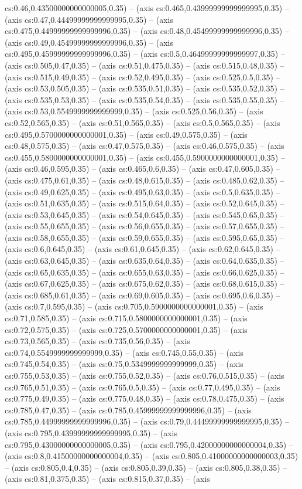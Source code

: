 cs:0.46,0.43500000000000005,0.35) -- (axis cs:0.465,0.43999999999999995,0.35) -- (axis cs:0.47,0.44499999999999995,0.35) -- (axis cs:0.475,0.44999999999999996,0.35) -- (axis cs:0.48,0.45499999999999996,0.35) -- (axis cs:0.49,0.45499999999999996,0.35) -- (axis cs:0.495,0.45999999999999996,0.35) -- (axis cs:0.5,0.46499999999999997,0.35) -- (axis cs:0.505,0.47,0.35) -- (axis cs:0.51,0.475,0.35) -- (axis cs:0.515,0.48,0.35) -- (axis cs:0.515,0.49,0.35) -- (axis cs:0.52,0.495,0.35) -- (axis cs:0.525,0.5,0.35) -- (axis cs:0.53,0.505,0.35) -- (axis cs:0.535,0.51,0.35) -- (axis cs:0.535,0.52,0.35) -- (axis cs:0.535,0.53,0.35) -- (axis cs:0.535,0.54,0.35) -- (axis cs:0.535,0.55,0.35) -- (axis cs:0.53,0.5549999999999999,0.35) -- (axis cs:0.525,0.56,0.35) -- (axis cs:0.52,0.565,0.35) -- (axis cs:0.51,0.565,0.35) -- (axis cs:0.5,0.565,0.35) -- (axis cs:0.495,0.5700000000000001,0.35) -- (axis cs:0.49,0.575,0.35) -- (axis cs:0.48,0.575,0.35) -- (axis cs:0.47,0.575,0.35) -- (axis cs:0.46,0.575,0.35) -- (axis cs:0.455,0.5800000000000001,0.35) -- (axis cs:0.455,0.5900000000000001,0.35) -- (axis cs:0.46,0.595,0.35) -- (axis cs:0.465,0.6,0.35) -- (axis cs:0.47,0.605,0.35) -- (axis cs:0.475,0.61,0.35) -- (axis cs:0.48,0.615,0.35) -- (axis cs:0.485,0.62,0.35) -- (axis cs:0.49,0.625,0.35) -- (axis cs:0.495,0.63,0.35) -- (axis cs:0.5,0.635,0.35) -- (axis cs:0.51,0.635,0.35) -- (axis cs:0.515,0.64,0.35) -- (axis cs:0.52,0.645,0.35) -- (axis cs:0.53,0.645,0.35) -- (axis cs:0.54,0.645,0.35) -- (axis cs:0.545,0.65,0.35) -- (axis cs:0.55,0.655,0.35) -- (axis cs:0.56,0.655,0.35) -- (axis cs:0.57,0.655,0.35) -- (axis cs:0.58,0.655,0.35) -- (axis cs:0.59,0.655,0.35) -- (axis cs:0.595,0.65,0.35) -- (axis cs:0.6,0.645,0.35) -- (axis cs:0.61,0.645,0.35) -- (axis cs:0.62,0.645,0.35) -- (axis cs:0.63,0.645,0.35) -- (axis cs:0.635,0.64,0.35) -- (axis cs:0.64,0.635,0.35) -- (axis cs:0.65,0.635,0.35) -- (axis cs:0.655,0.63,0.35) -- (axis cs:0.66,0.625,0.35) -- (axis cs:0.67,0.625,0.35) -- (axis cs:0.675,0.62,0.35) -- (axis cs:0.68,0.615,0.35) -- (axis cs:0.685,0.61,0.35) -- (axis cs:0.69,0.605,0.35) -- (axis cs:0.695,0.6,0.35) -- (axis cs:0.7,0.595,0.35) -- (axis cs:0.705,0.5900000000000001,0.35) -- (axis cs:0.71,0.585,0.35) -- (axis cs:0.715,0.5800000000000001,0.35) -- (axis cs:0.72,0.575,0.35) -- (axis cs:0.725,0.5700000000000001,0.35) -- (axis cs:0.73,0.565,0.35) -- (axis cs:0.735,0.56,0.35) -- (axis cs:0.74,0.5549999999999999,0.35) -- (axis cs:0.745,0.55,0.35) -- (axis cs:0.745,0.54,0.35) -- (axis cs:0.75,0.5349999999999999,0.35) -- (axis cs:0.755,0.53,0.35) -- (axis cs:0.755,0.52,0.35) -- (axis cs:0.76,0.515,0.35) -- (axis cs:0.765,0.51,0.35) -- (axis cs:0.765,0.5,0.35) -- (axis cs:0.77,0.495,0.35) -- (axis cs:0.775,0.49,0.35) -- (axis cs:0.775,0.48,0.35) -- (axis cs:0.78,0.475,0.35) -- (axis cs:0.785,0.47,0.35) -- (axis cs:0.785,0.45999999999999996,0.35) -- (axis cs:0.785,0.44999999999999996,0.35) -- (axis cs:0.79,0.44499999999999995,0.35) -- (axis cs:0.795,0.43999999999999995,0.35) -- (axis cs:0.795,0.43000000000000005,0.35) -- (axis cs:0.795,0.42000000000000004,0.35) -- (axis cs:0.8,0.41500000000000004,0.35) -- (axis cs:0.805,0.41000000000000003,0.35) -- (axis cs:0.805,0.4,0.35) -- (axis cs:0.805,0.39,0.35) -- (axis cs:0.805,0.38,0.35) -- (axis cs:0.81,0.375,0.35) -- (axis cs:0.815,0.37,0.35) -- (axis 